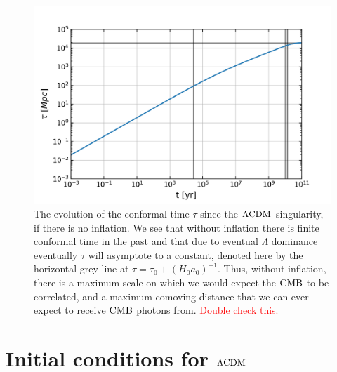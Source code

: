 \begin{figure}[!pth]
\centering     %
    \includegraphics[width=.75\columnwidth]{plots/lcdm_tau.png}
\caption{
    The evolution of the conformal time $\tau$ since the $\Lambda\text{CDM}$ singularity,
    if there is no inflation.
    We see that without inflation there is finite conformal time in the past
    and that due to eventual $\Lambda$ dominance
    eventually $\tau$ will asymptote to a constant,
    denoted here by the horizontal grey line at $\tau=\tau_0+(H_0a_0)^{-1}$.
    Thus, without inflation, there is a maximum scale on which we would expect the
    $\text{CMB}$ to be correlated, and a maximum comoving distance that we can ever
    expect to receive $\text{CMB}$ photons from.
    \textcolor{red}{Double check this.}
}\label{fig:lcdm_tau}
\end{figure}


\section{Initial conditions for $\Lambda\text{CDM}$}
